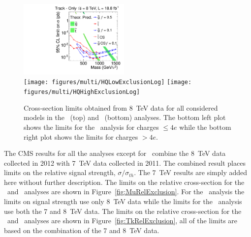 \begin{figure}
\centering
  \includegraphics[clip=false, trim=0.0cm 0cm 0.0cm 0cm, width=0.48\textwidth]{figures/tkonly/TkExclusionLog} \\
  \texttt{[image: figures/multi/HQLowExclusionLog]}
  \texttt{[image: figures/multi/HQHighExclusionLog]}
\caption[Cross-section limits obtained from 8~TeV data for all considered models in the \tkonly\ and \multi\ analyses]
{Cross-section limits obtained from 8~TeV data for all considered models in the \tkonly\ (top) and \multi\ (bottom) analyses.
The bottom left plot shows the limits for the \multi\ analysis for charges $\le 4e$ while the bottom right plot shows the limits for charges $> 4e$.
}
    \label{fig:TkExclusion}
\end{figure}

The CMS results for all the analyses except for \muononly\ combine the 8~TeV data collected in 2012 with 7~TeV data collected in 2011.
The combined result places limits on
the relative signal strength, $\sigma/\sigma_{th}$. The 7~TeV results are simply added here without further description.
The limits on the relative cross-section
for the \muononly\ and \tktof\ analyses are shown in Figure~\ref{fig:MuRelExclusion}. For the \muononly\ analysis the limits on signal strength use only 8~TeV data
while the limits for the \tktof\ analysis use both the 7 and 8~TeV data.
The limits on the relative cross-section for the \tkonly\ and \multi\ analyses are shown in Figure~\ref{fig:TkRelExclusion}, all of the limits are
based on the combination of the 7 and 8~TeV data.

